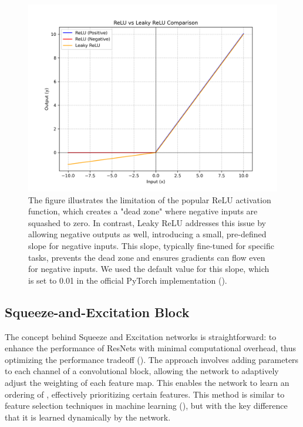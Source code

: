 \begin{figure}[htbp]
    \centering
    \includegraphics[width=0.7\linewidth]{images/methods_mono/leaky_relu/leaky_relu.png}
    \captionsetup{justification=justified, singlelinecheck=false, width=1\linewidth, labelfont=bf} 
    \caption[]{The figure illustrates the limitation of the popular ReLU activation function, which creates a "dead zone" where negative inputs are squashed to zero. In contrast, Leaky ReLU addresses this issue by allowing negative outputs as well, introducing a small, pre-defined slope for negative inputs. This slope, typically fine-tuned for specific tasks, prevents the dead zone and ensures gradients can flow even for negative inputs. We used the default value for this slope, which is set to 0.01 in the official PyTorch implementation (\cite{pytorchinit}).}
    \label{fig:leaky-relu}
\end{figure}

\subsection{Squeeze-and-Excitation Block} \label{subsec:se}

\noindent The concept behind Squeeze and Excitation networks is straightforward: to enhance the performance of ResNets with minimal computational overhead, thus optimizing the performance tradeoff (\textcolor{deepblue}{\cite{hu2017squeezeandexcitation}}). The approach involves adding parameters to each channel of a convolutional block, allowing the network to adaptively adjust the weighting of each feature map. This enables the network to learn an ordering of , effectively prioritizing certain features. This method is similar to feature selection techniques in machine learning (\textcolor{deepblue}{\cite{FeatureSelection}}), but with the key difference that it is learned dynamically by the network.

